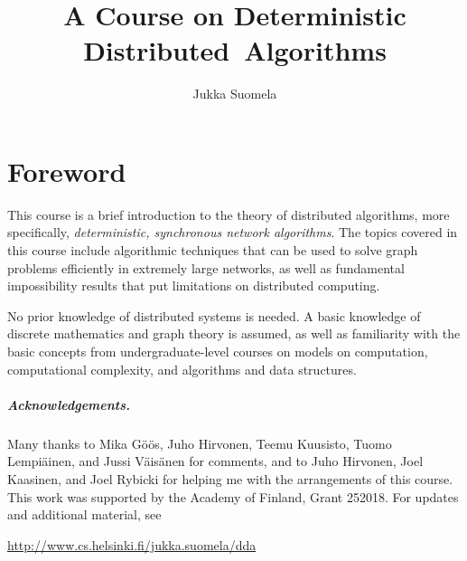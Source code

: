 
\newcommand{\definepage}[1]{\stepcounter{myexternalpagenum}\edef#1{\arabic{myexternalpagenum}}}




\title{A Course on Deterministic Distributed~Algorithms}
\author{Jukka Suomela}




\frontmatter
\maketitle
\tableofcontents

\chapter*{Foreword}

This course is a brief introduction to the theory of distributed algorithms, more specifically, \emph{deterministic, synchronous network algorithms}. The topics covered in this course include algorithmic techniques that can be used to solve graph problems efficiently in extremely large networks, as well as fundamental impossibility results that put limitations on distributed computing.

No prior knowledge of distributed systems is needed. A basic knowledge of discrete mathematics and graph theory is assumed, as well as familiarity with the basic concepts from undergraduate-level courses on models on computation, computational complexity, and algorithms and data structures.

\paragraph{Acknowledgements.}

Many thanks to Mika G\"o\"os, Juho Hirvonen, Tee\-mu Kuu\-sisto, Tuo\-mo Lem\-pi\"a\-inen, and Jussi V\"ai\-s\"a\-nen for comments, and to Juho Hirvonen, Joel Kaasinen, and Joel Rybicki for helping me with the arrangements of this course. This work was supported by the Academy of Finland, Grant 252018. For updates and additional material, see
\begin{center}
    \url{http://www.cs.helsinki.fi/jukka.suomela/dda}
\end{center}

